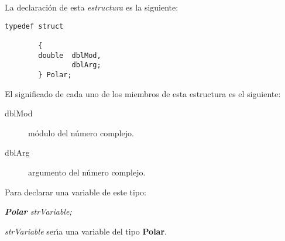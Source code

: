 La declaraci\'on de esta \emph{estructura} es la siguiente:

\begin{verbatim}
typedef struct

        {
        double  dblMod,
                dblArg;	
        } Polar;
\end{verbatim}

El significado de cada uno de los miembros de esta estructura es el siguiente:

\begin{description}
\item[dblMod] m\'odulo del n\'umero complejo.
\item[dblArg] argumento del n\'umero complejo.
\end{description}

Para declarar una variable de este tipo:

\begin{center}
\emph{\textbf{Polar} strVariable;}
\end{center}

\emph{strVariable} ser\'{\i}a una variable del tipo \textbf{Polar}.

